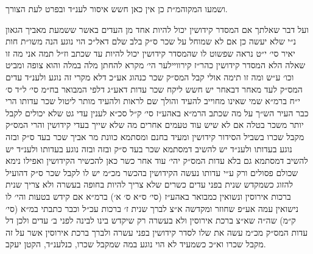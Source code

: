 \documentclass[12pt, openany]{book}
\begin{document}
\begin{multicols}{2}
ושמעו המקוהמ״ת כן אין כאן חשש איסור לענ״ד ובפרט לעת הצורך.\\\vspace{0pt}

ועל דבר שאלתך אם המסדר קידושין יכול להיות אחד מן העדים באשר ששמעת מאביך הגאון נ״י שלא יעשה כן אם לא שמוחל על שכר ס״ק בלב שלם דאל״כ הוי נוגע הנה משו״ת חות יאיר סי׳ י״ט נראה שפשוט לו שהמסדר קידושין יכול להיות עד שכתב וז״ל תמה אני מה זו שאלה הלא המסדר קידושין כהר״ז קירוויילער הי׳ מקרא להחתן מלה במלה והוא צופה ומביט וכו׳ ע״ש ומה זו תימה אולי קבל המס״ק שכר כנהוג אע״כ דלא מקרי זה נוגע ולענ״ד עדים המס״ק לעד מאחר דבאחר יש חשש ליקח שכר עדות דאע״ג דלפי המבואר בח״מ סי׳ ל״ד ס׳ י״ח ברמ״א שמי שאינו מחוייב להעיד והולך שם לראות ולהעיד מותר ליטול שכר עדותו הרי כבר העיר הש״ך על מה שכתב הרמ״א באהע״ז סי׳ ק״ל סכ״א לענין עדי גט שלא יכולים לקבל יותר משכר בטלה אם לא שיש עוד טעמים אחרים מה שלא שייך בעדי קידושין והרי המס״ק מקבל שכרו בשביל הסידור קידושין ומעיד בחנם ומסתמא כוונת מר אביך שכר בעד ס״ק ובזה נוגע בעדותו ולענ״ד יש להשיב דמסתמא שכר בעד ס״ק ובזה ובזה נוגע בעדותו ולענ״ד יש להשיב דמסתמא גם בלא עדות המס״ק יהי׳ עוד אחר כשר כאן להכשיר הקידושין ואפילו נימא שכולם פסולים ורק ע״י עדותו נעשה הקידושין בהכשר מכ״מ יש לו לקבל שכר ס״ק דהועיל להזוג כשמקדש שנית בפני עדים כשרים שלא צריך להיות בחופה בעשרה ולא צריך שנית ברכות אירוסין ונשואין כמבואר באהע״ז (סי׳ ס״א ס׳ א׳) ברמ״א אם קידש בטעות והי׳ לו נישואין עמה אע״פ שחוזר ומקדשה א״צ לברך שנית ז׳ ברכות עכ״ל וכבר כתבתי במ״א (סי׳ ק״מ) שה״ה שא״צ ברכת אירוסין ולא בעשרה רק שיקדש בינו לבינה לפני ב׳ עדים ולכן דל עדות המס״ק מכ״מ עשה את שלו לסדר קידושין בפני עשרה ולברך ברכת אירוסין אשר על זה מקבל שכרו וא״כ כשמעיד לא הוי נוגע במה שמקבל שכרו, כנלענ״ד, הקטן יעקב.\\\vspace{0pt}

\end{multicols}\newpage
\end{document}
